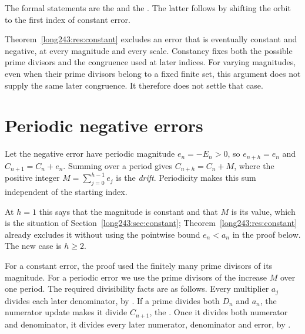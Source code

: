 \documentclass[11pt]{article}
\begin{document}
\noindent The formal statements are the
 and the
. The latter follows by shifting the orbit to the first index
of constant error.

Theorem~\ref{long243:res:constant} excludes an error that is eventually constant
and negative, at every magnitude and every scale. Constancy fixes both
the possible prime divisors and the congruence used at later indices.
For varying magnitudes, even when their prime divisors belong to a fixed
finite set, this argument does not supply the same later congruence.
It therefore does not settle that case.

\section{Periodic negative errors}\label{long243:sec:periodic}

Let the negative error have periodic magnitude $e_n=-E_n>0$, so
$e_{n+h}=e_n$ and $C_{n+1}=C_n+e_n$. Summing over a period gives
$C_{n+h}=C_n+M$, where the positive integer
$M=\sum_{j=0}^{h-1}e_j$ is the \emph{drift}. Periodicity makes this
sum independent of the starting index.

At $h=1$ this says that the magnitude is constant and that $M$ is its value,
which is the situation of Section~\ref{long243:sec:constant};
Theorem~\ref{long243:res:constant} already excludes it without using
the pointwise bound $e_n<a_n$ in the proof below. The new case is $h\ge2$.

For a constant error, the proof used the finitely many prime divisors of
its magnitude. For a periodic error we use the prime divisors of the
increase $M$ over one period. The required divisibility facts are as
follows. Every multiplier $a_j$ divides each later denominator, by
. If a prime divides both $D_n$ and $a_n$, the numerator
update makes it divide $C_{n+1}$, the
. Once it divides both numerator and denominator,
it divides every later numerator, denominator and error, by
.
\end{document}
